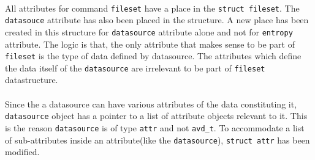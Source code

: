\paragraph{}
All attributes for command \verb+fileset+ have a place in the \verb+struct fileset+. The \verb+datasouce+ attribute has also been placed in the structure. A new place has been created in this structure for \verb+datasource+ attribute alone and not for \verb+entropy+ attribute. The logic is that, the only attribute that makes sense to be part of \verb+fileset+ is the type of data defined by datasource. The attributes which define the data itself of the \verb+datasource+ are irrelevant to be part of \verb+fileset+ datastructure.
\paragraph{}
Since the a datasource can have various attributes of the data constituting it, \verb+datasource+ object has a pointer to a list of attribute objects relevant to it. This is the reason \verb+datasource+ is of type \verb+attr+ and not \verb+avd_t+. To accommodate  a list of sub-attributes inside an attribute(like the \verb+datasource+), \verb+struct attr+ has been modified.